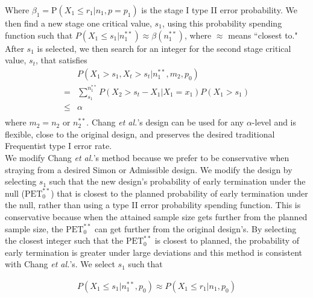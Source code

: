 \documentclass[12pt]{report}\usepackage[]{graphicx}\usepackage[]{color}
\newlength{\li}\setlength{\li}{14.48pt}
\newlength{\di}\setlength{\di}{-3.5mm}
\begin{document}
Where $\beta_1 = \mbox{P}(X_1 \leq r_1 \vert n_1, p = p_1)$ is the stage I type II error probability.
We then find a new stage one critical value, $s_1$, using this probability spending function such that $P(X_1 \leq s_1 | n_1^{\ast\ast}) \approx \beta(n_1^{\ast\ast})$, where $\approx$ means ``closest to." After $s_1$ is selected, we then search for an integer for the second stage critical value, $s_t$, that satisfies
\begin{equation}
\begin{aligned}
& P(X_1 > s_1, X_t > s_t | n_1^{\ast\ast}, m_2, p_0) \\
= & \sum_{s_1}^{n_1^{\ast\ast}} P(X_2 > s_t - X_1 | X_1 = x_1) P(X_1 > s_1) \\
 \leq & \alpha \\
\end{aligned}
\end{equation}
where $m_2 = n_2$ or $n_2^{\ast\ast}$. 
Chang \textit{et al.}'s design can be used for any $\alpha$-level and is flexible, close to the original design, and preserves the desired traditional Frequentist type I error rate. \\
We modify Chang \textit{et al.}'s method because we prefer to be conservative when straying from a desired Simon or Admissible design. We modify the design by selecting $s_1$ such that the new design's probability of early termination under the null ($\mbox{PET}_0^{\ast\ast}$) that is closest to the planned probability of early termination under the null, rather than using a type II error probability spending function. This is conservative because when the attained sample size gets further from the planned sample size, the $\mbox{PET}_0^{\ast\ast}$ can get further from the original design's. By selecting the closest integer such that the $\mbox{PET}_0^{\ast\ast}$ is closest to planned, the probability of early termination is greater under large deviations and this method is consistent with Chang \textit{et al.}'s. We select $s_1$ such that 

\begin{equation}
\begin{aligned}
P(X_1 \leq s_1 | n_1^{\ast\ast}, p_0) \approx P(X_1 \leq r_1 | n_1, p_0)
\end{aligned}
\end{equation}
\end{document}

